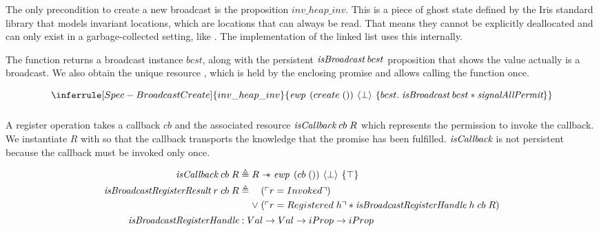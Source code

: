 \subsubsection{}
\label{sec:broadcast-spec-create}

The only precondition to create a new broadcast is the proposition \(inv\_heap\_inv\).
This is a piece of ghost state defined by the Iris standard library that models invariant locations, which are locations that can always be read.
That means they cannot be explicitly deallocated and can only exist in a garbage-collected setting, like \ocf{}.
The implementation of the linked list uses this internally.

The function returns a broadcast instance \(bcst\), along with the persistent \(\emph{isBroadcast}{}\; bcst\) proposition that shows the value actually is a broadcast.
We also obtain the unique resource \gssignal{}, which is held by the enclosing promise and allows calling the  function once.

\[
  \inferrule[Spec-BroadcastCreate]
  {inv\_heap\_inv}
  {\ewp{create\; ()}{\bot}{bcst.\; \gsIsBcst{}\; bcst \ast \gssignal{}}}
\]

\subsubsection{}
\label{sec:broadcast-spec-suspend}

A register operation takes a callback \(cb\) and the associated resource \(\emph{isCallback}{}\; cb\; R\) which represents the permission to invoke the callback.
We instantiate \(R\) with \gspdone{\gamma} so that the callback transports the knowledge that the promise has been fulfilled.
\(\emph{isCallback}{}\) is not persistent because the callback must be invoked only once.

\begin{align*}
  \gsIsCb{}\; cb\; R                            & \triangleq R \wand \ewp{cb\; ()}{\bot}{\top}                                                           \\
  \emph{isBroadcastRegisterResult}\; r\; cb\; R & \triangleq \begin{aligned}[t]
                                                  & (\ulcorner r = Invoked \urcorner)                                                           \\
                                                \vee\; & (\ulcorner r = Registered\; h \urcorner \ast \emph{isBroadcastRegisterHandle}\; h\; cb\; R) 
                                                \end{aligned}\\
  \emph{isBroadcastRegisterHandle}              & : Val \to Val \to iProp \to iProp
\end{align*}

